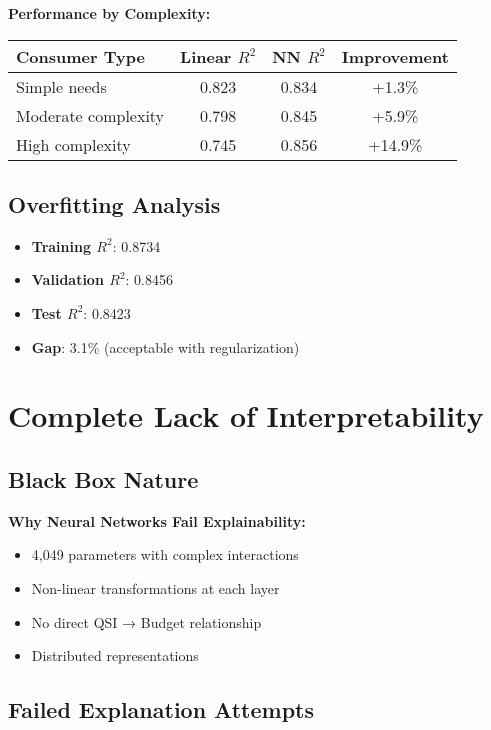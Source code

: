 \textbf{Performance by Complexity:}
\begin{center}
\begin{tabular}{lccc}
\toprule
Consumer Type & Linear $R^2$ & NN $R^2$ & Improvement \\
\midrule
Simple needs & 0.823 & 0.834 & +1.3\% \\
Moderate complexity & 0.798 & 0.845 & +5.9\% \\
High complexity & 0.745 & 0.856 & +14.9\% \\
\bottomrule
\end{tabular}
\end{center}

\subsection{Overfitting Analysis}

\begin{itemize}
    \item \textbf{Training $R^2$}: 0.8734
    \item \textbf{Validation $R^2$}: 0.8456
    \item \textbf{Test $R^2$}: 0.8423
    \item \textbf{Gap}: 3.1\% (acceptable with regularization)
\end{itemize}

\section{Complete Lack of Interpretability}

\subsection{Black Box Nature}

\textbf{Why Neural Networks Fail Explainability:}
\begin{itemize}
    \item 4,049 parameters with complex interactions
    \item Non-linear transformations at each layer
    \item No direct QSI → Budget relationship
    \item Distributed representations
\end{itemize}

\subsection{Failed Explanation Attempts}

